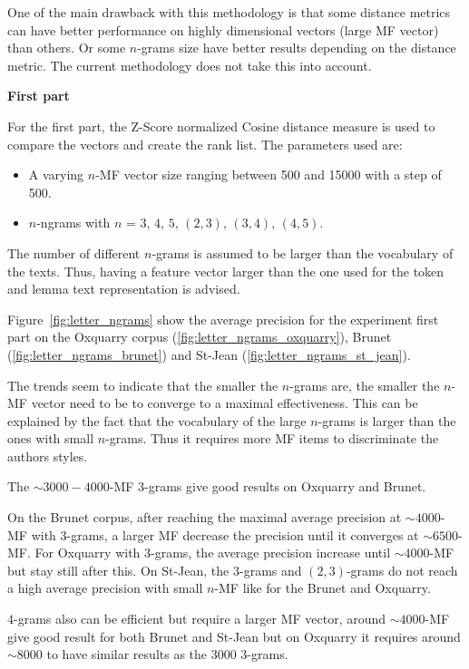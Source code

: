 One of the main drawback with this methodology is that some distance metrics can have better performance on highly dimensional vectors (large MF vector) than others.
Or some $n$-grams size have better results depending on the distance metric.
The current methodology does not take this into account.

\textbf{First part}

For the first part, the Z-Score normalized Cosine distance measure is used to compare the vectors and create the rank list.
The parameters used are:

\begin{itemize}
  \item
  A varying $n$-MF vector size ranging between 500 and 15000 with a step of 500.
  \item
  $n$-ngrams with $n$ = $3$, $4$, $5$, $(2, 3)$, $(3, 4)$, $(4, 5)$.
\end{itemize}

The number of different $n$-grams is assumed to be larger than the vocabulary of the texts.
Thus, having a feature vector larger than the one used for the token and lemma text representation is advised.

Figure~\ref{fig:letter_ngrams} show the average precision for the experiment first part on the Oxquarry corpus (\ref{fig:letter_ngrams_oxquarry}), Brunet (\ref{fig:letter_ngrams_brunet}) and St-Jean (\ref{fig:letter_ngrams_st_jean}).

The trends seem to indicate that the smaller the $n$-grams are, the smaller the $n$-MF vector need to be to converge to a maximal effectiveness.
This can be explained by the fact that the vocabulary of the large $n$-grams is larger than the ones with small $n$-grams.
Thus it requires more MF items to discriminate the authors styles.

The $\sim 3000-4000$-MF $3$-grams give good results on Oxquarry and Brunet.

On the Brunet corpus, after reaching the maximal average precision at $\sim 4000$-MF with $3$-grams, a larger MF decrease the precision until it converges at $\sim 6500$-MF.
For Oxquarry with $3$-grams, the average precision increase until $\sim 4000$-MF but stay still after this.
On St-Jean, the $3$-grams and $(2,3)$-grams do not reach a high average precision with small $n$-MF like for the Brunet and Oxquarry.

$4$-grams also can be efficient but require a larger MF vector, around $\sim 4000$-MF give good result for both Brunet and St-Jean but on Oxquarry it requires around $\sim 8000$ to have similar results as the $3000$ $3$-grams.

